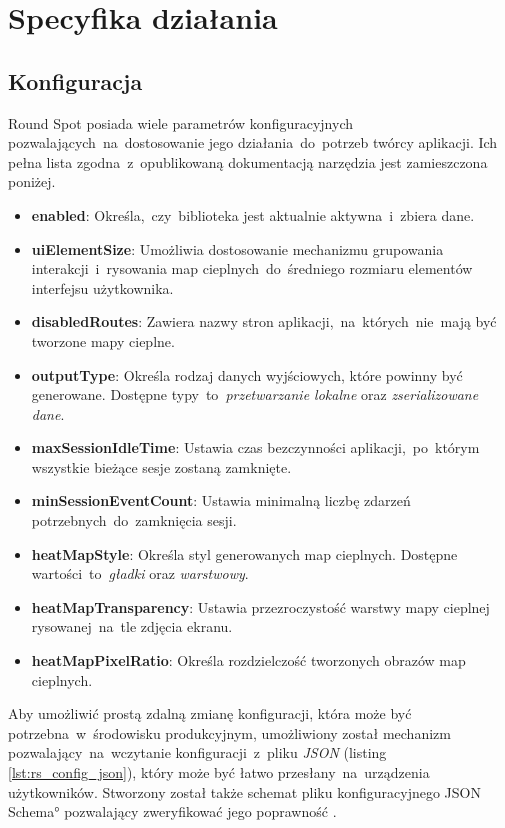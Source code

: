 \section{Specyfika działania}

\subsection{Konfiguracja}
\label{sec:rs_config}
Round Spot posiada wiele parametrów konfiguracyjnych pozwalających~na~dostosowanie jego działania~do~potrzeb twórcy aplikacji. Ich pełna lista zgodna~z~opublikowaną dokumentacją narzędzia \cite{RoundSpot_Config_Docs} jest zamieszczona poniżej.
\begin{itemize}
	\item {\bf enabled}: Określa,~czy~biblioteka jest aktualnie aktywna~i~zbiera dane.
	\item {\bf uiElementSize}: Umożliwia dostosowanie mechanizmu grupowania interakcji~i~rysowania map cieplnych~do~średniego rozmiaru elementów interfejsu użytkownika.
	\item {\bf disabledRoutes}: Zawiera nazwy stron aplikacji,~na~których~nie~mają być tworzone mapy cieplne.
	\item {\bf outputType}: Określa rodzaj danych wyjściowych, które powinny być generowane. Dostępne typy~to~{\it przetwarzanie lokalne} oraz {\it zserializowane dane}.
	\item {\bf maxSessionIdleTime}: Ustawia czas bezczynności aplikacji,~po~którym wszystkie bieżące sesje zostaną zamknięte.
	\item {\bf minSessionEventCount}: Ustawia minimalną liczbę zdarzeń potrzebnych~do~zamknięcia sesji.
	\item {\bf heatMapStyle}: Określa styl generowanych map cieplnych. Dostępne wartości~to~{\it gładki} oraz {\it warstwowy}.
	\item {\bf heatMapTransparency}: Ustawia przezroczystość warstwy mapy cieplnej rysowanej~na~tle zdjęcia ekranu. 
	\item {\bf heatMapPixelRatio}: Określa rozdzielczość tworzonych obrazów map cieplnych.
\end{itemize}

Aby umożliwić prostą zdalną zmianę konfiguracji, która może być potrzebna~w~środowisku produkcyjnym, umożliwiony został mechanizm pozwalający~na~wczytanie konfiguracji~z~pliku {\it JSON} (listing \ref{lst:rs_config_json}), który może być łatwo przesłany~na~urządzenia użytkowników. Stworzony został także schemat pliku konfiguracyjnego \ang{JSON Schema} pozwalający zweryfikować jego poprawność \cite{RoundSpot_Config_Schema}.

